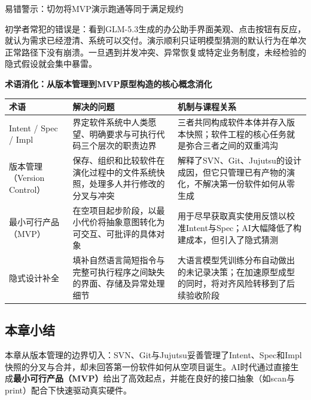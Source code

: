 \documentclass[UTF8,a4paper,11pt,fontset=fandol]{ctexart}
\begin{document}
\begin{warningbox}{易错警示：切勿将MVP演示跑通等同于满足规约}

初学者常犯的错误是：看到GLM-5.3生成的办公助手界面美观、点击按钮有反应，就认为需求已经澄清、系统可以交付。演示顺利只证明模型猜测的默认行为在单次正常路径下没有崩溃。一旦遇到并发冲突、异常恢复或特定业务制度，未经检验的隐式假设就会集中暴雷。

\end{warningbox}

\par{}\textbf{术语消化：从版本管理到MVP原型构造的核心概念消化}

\begin{center}\small\begin{tabularx}{\linewidth}{YYY}

\toprule

术语 & 解决的问题 & 机制与课程关系\\\midrule

Intent / Spec / Impl & 界定软件系统中人类愿望、明确要求与可执行代码三个层次的职责边界 & 三者共同构成软件本体并存入版本快照；软件工程的核心任务就是弥合三者之间的双重鸿沟\\[3pt]

版本管理（Version Control） & 保存、组织和比较软件在演化过程中的文件系统快照，处理多人并行修改的分叉与冲突 & 解释了SVN、Git、Jujutsu的设计成因，但它只管理已有产物的演化，不解决第一份软件如何从零生成\\[3pt]

最小可行产品（MVP） & 在空项目起步阶段，以最小代价将抽象意图转化为可交互、可批评的具体对象 & 用于尽早获取真实使用反馈以校准Intent与Spec；AI大幅降低了构建成本，但引入了隐式猜测\\[3pt]

隐式设计补全 & 填补自然语言简短指令与完整可执行程序之间缺失的界面、存储及异常处理细节 & 大语言模型凭训练分布自动做出的未记录决策；在加速原型成型的同时，将对齐风险转移到了后续验收阶段\\[3pt]

\bottomrule\end{tabularx}\end{center}

\subsection{本章小结}

本章从版本管理的边界切入：SVN、Git与Jujutsu妥善管理了Intent、Spec和Impl快照的分叉与合并，却未回答第一份软件如何从空项目诞生。AI时代通过直接生成\textbf{最小可行产品（MVP）}给出了高效起点，并能在良好的接口抽象（如scan与print）配合下快速驱动真实硬件。
\end{document}
